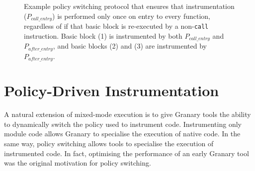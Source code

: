 \documentclass[preprint]{sigplanconf}
\let\ORIGcaption\caption
\begin{document}
\begin{figure*}[ht!]
\vspace{-2em}
\centering
{}
\hfill
\hfill
\ORIGcaption{\label{fig:policy_switching}Example policy switching protocol that ensures that instrumentation ($P_{\mathit{call\_entry}}$) is performed only once on entry to every function, regardless of if that basic block is re-executed by a non-\texttt{call} instruction. Basic block (1) is instrumented by both $P_{\mathit{call\_entry}}$ and $P_{\mathit{after\_entry}}$, and basic blocks (2) and (3) are instrumented by $P_{\mathit{after\_entry}}$.}
\end{figure*}


\section{Policy-Driven Instrumentation}\label{sec:policies}

A natural extension of mixed-mode execution is to give Granary tools the ability to dynamically switch the policy used to instrument code. Instrumenting only module code allows Granary to specialise the execution of native code. In the same way, policy switching allows tools to specialise the execution of instrumented code. In fact, optimising the performance of an early Granary tool was the original motivation for policy switching.
\end{document}
